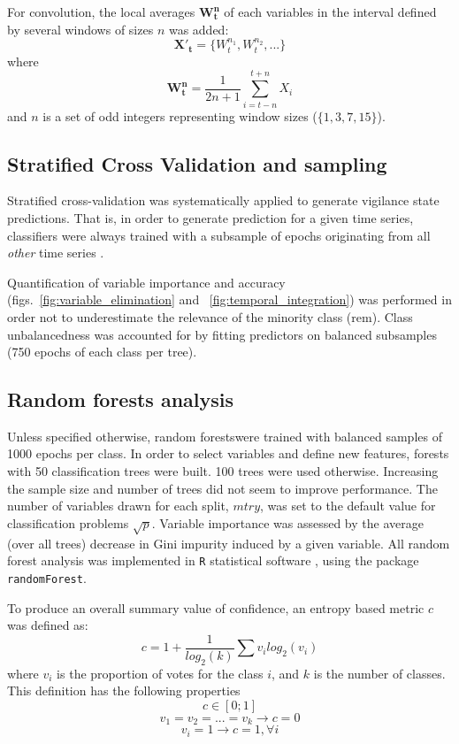 For convolution, the local averages $\mathbf{W^n_t}$ of each variables
in the interval defined by several windows of sizes $n$ was added:
\begin{equation}
\mathbf{{X'}_t} = \{W^{n_1}_t, W^{n_2}_t, ...\}
\label{eq:window}
\end{equation}
where
\[
\mathbf{W^n_t} = \frac{1}{2n+1} \sum_{i = t-n}^{t+n}{X_i}
\]
and $n$ is a set of odd integers representing window sizes (\eg $\{1,3,7,15\}$).



\subsection{Stratified Cross Validation and sampling}


Stratified cross-validation was systematically applied to generate vigilance state predictions.
That is, in order to generate prediction for a given time series, classifiers were always trained with a subsample of epochs
originating from all \emph{other} time series \cite{ding_querying_2008}.

Quantification of variable importance and accuracy (figs.~\ref{fig:variable_elimination} and ~\ref{fig:temporal_integration}) was performed in order 
not to underestimate the relevance of the minority class
(\gls{rem})\cite{boulesteix_overview_2012}.
Class  unbalancedness was accounted for by fitting predictors on balanced subsamples (750 epochs of each class per tree).


\subsection{Random forests analysis}
Unless specified otherwise, random forests\cite{breiman_random_2001}were trained
with balanced samples of 1000 epochs per class.
In order to select variables and define new features, forests with 50 classification trees were built.
100 trees were used otherwise.
Increasing the sample size and number of trees did not seem to improve performance.
The number of variables drawn for each split, $mtry$, was set to the default value for classification problems $\sqrt{p}$.
Variable importance was assessed by the average (over all trees) decrease in Gini impurity induced by a given variable.
All random forest analysis was implemented in \texttt{R} statistical software
\cite{r_core_team_r:_2014}, using the package
\texttt{randomForest}\cite{liaw_classification_2002}.

To produce an overall summary value of confidence, an entropy based metric $c$ was defined as:
\begin{equation}
c = 1 + \frac{1}{log_2(k)}\sum{v_i  log_2(v_i)}
\label{eq:entropy}
\end{equation}
where $v_i$ is the proportion of votes for the class $i$, and $k$ is the number of classes. 
This definition has the following properties 
\[
c \in [0;1]
\]
\[
v_1 = v_2 = ... = v_k \rightarrow c = 0
\]
\[
v_i = 1 \rightarrow c = 1 , \forall i
\]




